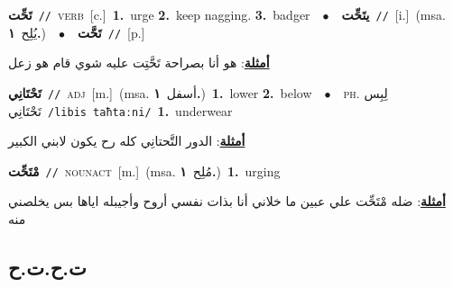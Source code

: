 \documentclass[10pt,a4paper,twoside]{article} %
\begin{document}
\begin{multicols}{2}
{{{\setlength\topsep{0pt}\textbf{\foreignlanguage{arabic}{تَحِّت}}\ {\color{gray}\texttt{//}\color{black}}\ \textsc{verb}\ [c.]\ \textbf{1.}~urge  \textbf{2.}~keep nagging.  \textbf{3.}~badger\ \ $\bullet$\ \ \setlength\topsep{0pt}\textbf{\foreignlanguage{arabic}{يتَحِّت}}\ {\color{gray}\texttt{//}\color{black}}\ [i.]\ \color{gray}(msa. \foreignlanguage{arabic}{يُلِح}~\foreignlanguage{arabic}{\textbf{١.}})\color{black}\ \ $\bullet$\ \ \setlength\topsep{0pt}\textbf{\foreignlanguage{arabic}{تَحَّت}}\ {\color{gray}\texttt{//}\color{black}}\ [p.]\  \begin{flushright}\color{gray}\foreignlanguage{arabic}{\textbf{\underline{\foreignlanguage{arabic}{أمثلة}}}: هو أنا بصراحة تَحَّتِت عليه شوي قام هو زعل}\end{flushright}\color{black}} \vspace{2mm}

{\setlength\topsep{0pt}\textbf{\foreignlanguage{arabic}{تَحْتَانِي}}\ {\color{gray}\texttt{//}\color{black}}\ \textsc{adj}\ [m.]\ \color{gray}(msa. \foreignlanguage{arabic}{أسفل}~\foreignlanguage{arabic}{\textbf{١.}})\color{black}\ \textbf{1.}~lower  \textbf{2.}~below\ \ $\bullet$\ \ \textsc{ph.} \color{gray} \foreignlanguage{arabic}{لِبِس تَحْتَانِي}\color{black}\ {\color{gray}\texttt{/{\sffamily libis taħtaːni}/}\color{black}}\ \textbf{1.}~underwear\  \begin{flushright}\color{gray}\foreignlanguage{arabic}{\textbf{\underline{\foreignlanguage{arabic}{أمثلة}}}: الدور التَّحتانِي كله رح يكون لابني الكبير}\end{flushright}\color{black}} \vspace{2mm}

{\setlength\topsep{0pt}\textbf{\foreignlanguage{arabic}{مْتَحِّت}}\ {\color{gray}\texttt{//}\color{black}}\ \textsc{noun\textunderscore act}\ [m.]\ \color{gray}(msa. \foreignlanguage{arabic}{مُلِح}~\foreignlanguage{arabic}{\textbf{١.}})\color{black}\ \textbf{1.}~urging\  \begin{flushright}\color{gray}\foreignlanguage{arabic}{\textbf{\underline{\foreignlanguage{arabic}{أمثلة}}}: ضله مْتَحِّت علي عبين ما خلاني أنا بذات نفسي أروح وأجيبله اياها بس يخلصني منه}\end{flushright}\color{black}} \vspace{2mm}

\vspace{-3mm}
\subsection*{\color{blue}\foreignlanguage{arabic}{ت.ح.ت.ح}\color{blue}{ (ntws)}} 

}}
\end{multicols}
\end{document}
